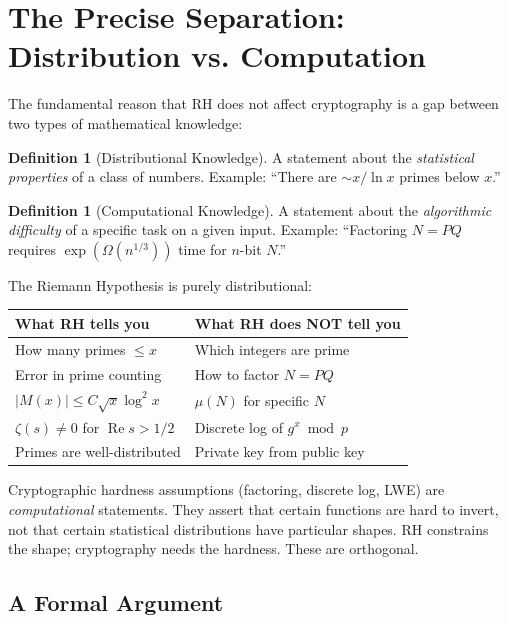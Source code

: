 \documentclass[11pt,a4paper]{article}
\theoremstyle{definition}
\newtheorem{definition}[theorem]{Definition}
\theoremstyle{plain}
\newcommand{\re}{\operatorname{Re}}
\begin{document}
\section{The Precise Separation: Distribution vs. Computation}
\label{sec:separation}

The fundamental reason that RH does not affect cryptography is a
gap between two types of mathematical knowledge:

\begin{definition}[Distributional Knowledge]
A statement about the \emph{statistical properties} of a class of
numbers. Example: ``There are $\sim x/\ln x$ primes below $x$.''
\end{definition}

\begin{definition}[Computational Knowledge]
A statement about the \emph{algorithmic difficulty} of a specific
task on a given input. Example: ``Factoring $N = PQ$ requires
$\exp(\Omega(n^{1/3}))$ time for $n$-bit $N$.''
\end{definition}

The Riemann Hypothesis is purely distributional:

\begin{center}
\begin{tabular}{@{}ll@{}}
\toprule
\textbf{What RH tells you} & \textbf{What RH does NOT tell you} \\
\midrule
How many primes $\leq x$ & Which integers are prime \\
Error in prime counting & How to factor $N = PQ$ \\
$|M(x)| \leq C\sqrt{x}\log^2 x$ & $\mu(N)$ for specific $N$ \\
$\zeta(s) \neq 0$ for $\re s > 1/2$ & Discrete log of $g^x \bmod p$ \\
Primes are well-distributed & Private key from public key \\
\bottomrule
\end{tabular}
\end{center}

Cryptographic hardness assumptions (factoring, discrete log, LWE)
are \emph{computational} statements. They assert that certain functions
are hard to invert, not that certain statistical distributions have
particular shapes. RH constrains the shape; cryptography needs the
hardness. These are orthogonal.

\subsection{A Formal Argument}
\end{document}
